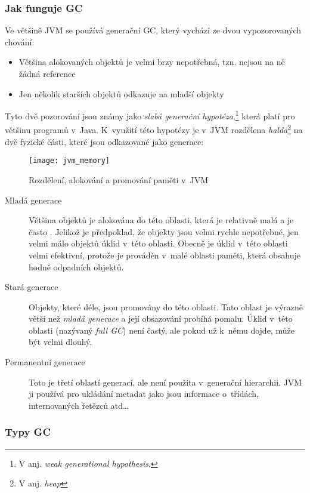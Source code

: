 \subsubsection{Jak funguje GC}
Ve většině JVM se používá generační GC, který vychází ze dvou vypozorovaných chování:
\begin{itemize}
  \item Většina alokovaných objektů je velmi brzy nepotřebná, tzn. nejsou na ně žádná reference
  \item Jen několik starších objektů odkazuje na mladší objekty
\end{itemize}
Tyto dvě pozorování jsou známy jako \emph{slabá generační hypotéza}\cite{hunt2011java},\footnote{V anj. \emph{weak generational hypothesis}.} která platí pro většinu programů v~Java.
K~využití této hypotézy je v~JVM rozdělena \emph{halda}\footnote{V anj. \emph{heap}} na dvě fyzické části, které jsou odkazované jako generace:

\begin{figure}[h]
\centering
\texttt{[image: jvm\_memory]}
\caption{Rozdělení, alokování a promování paměti v~JVM}
\label{fig:jvm_memory}
\end{figure}

\begin{description}
  \item[Mladá generace] Většina objektů je alokována do této oblasti, která je relativně malá a je často .
Jelikož je předpoklad, že objekty jsou velmi rychle nepotřebné, jen velmi málo objektů  úklid v~této oblasti.
Obecně je úklid v~této oblasti velmi efektivní, protože je prováděn v~malé oblasti paměti, která obsahuje hodně odpadních objektů.

  \item[Stará generace] Objekty, které  déle, jsou promovány do této oblasti.
Tato oblast je výrazně větší než \emph{mladá generace} a její obsazování probíhá pomalu.
Úklid v~této oblasti (nazývaný \emph{full GC}) není častý, ale pokud už k~němu dojde, může být velmi dlouhý.

  \item[Permanentní generace] Toto je třetí oblastí generací, ale není použita v~generační hierarchii.
JVM ji používá pro ukládání metadat jako jsou informace o~třídách, internovaných řetězců atd\ldots
\end{description}

\subsubsection{Typy GC\label{subsub:gctypes}}

